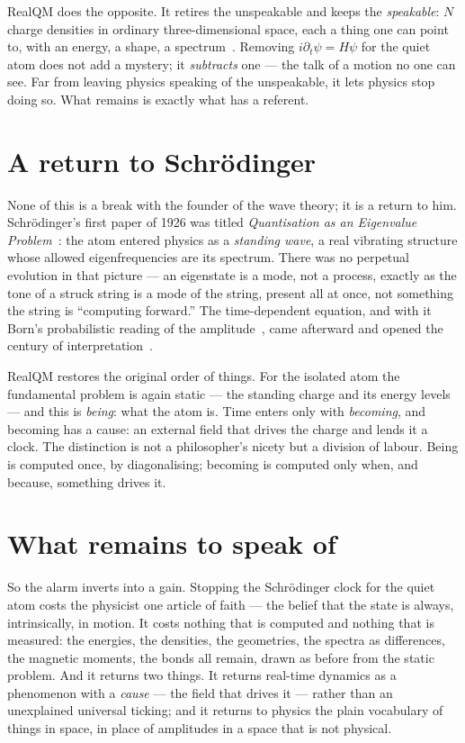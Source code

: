 \documentclass[11pt]{article}
\begin{document}
RealQM does the opposite. It retires the unspeakable and keeps the \emph{speakable}: $N$ charge densities in
ordinary three-dimensional space, each a thing one can point to, with an energy, a shape, a
spectrum~\cite{RealQM,Ontology}. Removing $i\partial_t\psi=H\psi$ for the quiet atom does not add a mystery; it
\emph{subtracts} one --- the talk of a motion no one can see. Far from leaving physics speaking of the
unspeakable, it lets physics stop doing so. What remains is exactly what has a referent.

\section{A return to Schr\"odinger}

None of this is a break with the founder of the wave theory; it is a return to him. Schr\"odinger's first
paper of 1926 was titled \emph{Quantisation as an Eigenvalue Problem}~\cite{Schrodinger26}: the atom entered
physics as a \emph{standing wave}, a real vibrating structure whose allowed eigenfrequencies are its spectrum.
There was no perpetual evolution in that picture --- an eigenstate is a mode, not a process, exactly as the
tone of a struck string is a mode of the string, present all at once, not something the string is ``computing
forward.'' The time-dependent equation, and with it Born's probabilistic reading of the
amplitude~\cite{Born26}, came afterward and opened the century of interpretation~\cite{Philosophy}.

RealQM restores the original order of things. For the isolated atom the fundamental problem is again static ---
the standing charge and its energy levels --- and this is \emph{being}: what the atom is. Time enters only with
\emph{becoming}, and becoming has a cause: an external field that drives the charge and lends it a clock. The
distinction is not a philosopher's nicety but a division of labour. Being is computed once, by diagonalising;
becoming is computed only when, and because, something drives it.

\section{What remains to speak of}

So the alarm inverts into a gain. Stopping the Schr\"odinger clock for the quiet atom costs the physicist one
article of faith --- the belief that the state is always, intrinsically, in motion. It costs nothing that is
computed and nothing that is measured: the energies, the densities, the geometries, the spectra as differences,
the magnetic moments, the bonds all remain, drawn as before from the static problem. And it returns two things.
It returns real-time dynamics as a phenomenon with a \emph{cause} --- the field that drives it --- rather than
an unexplained universal ticking; and it returns to physics the plain vocabulary of things in space, in place
of amplitudes in a space that is not physical.
\end{document}
